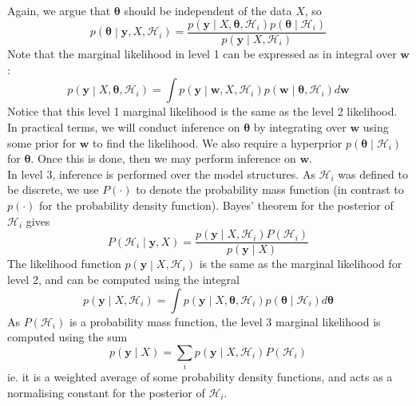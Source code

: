 \documentclass[11pt]{report} %
\begin{document}
Again, we argue that $\boldsymbol{\theta}$ should be independent of the data $X$, so
\begin{equation}
p\left(\boldsymbol{\theta}\middle|\mathbf{y}, X, \mathcal{H}_{i}\right) = \dfrac{p\left(\mathbf{y}\middle|X, \boldsymbol{\theta}, \mathcal{H}_{i}\right) p\left(\boldsymbol{\theta}\middle| \mathcal{H}_{i}\right)}{p\left(\mathbf{y}\middle|X, \mathcal{H}_{i}\right)}
\end{equation}
Note that the marginal likelihood in level 1 can be expressed as in integral over $\mathbf{w}$:
\begin{equation}
p\left(\mathbf{y}\middle|X, \boldsymbol{\theta}, \mathcal{H}_{i}\right) = \int p\left(\mathbf{y}\middle|\mathbf{w}, X, \mathcal{H}_{i}\right)p\left(\mathbf{w}\middle|\boldsymbol{\theta}, \mathcal{H}_{i}\right) d\mathbf{w}
\end{equation}
Notice that this level 1 marginal likelihood is the same as the level 2 likelihood. In practical terms, we will conduct inference on $\boldsymbol{\theta}$ by integrating over $\mathbf{w}$ using some prior for $\mathbf{w}$ to find the likelihood. We also require a hyperprior $p\left(\boldsymbol{\theta}\middle|\mathcal{H}_{i}\right)$ for $\boldsymbol{\theta}$. Once this is done, then we may perform inference on $\mathbf{w}$. \\

In level 3, inference is performed over the model structures. As $\mathcal{H}_{i}$ was defined to be discrete, we use $P\left(\cdot\right)$ to denote the probability mass function (in contrast to $p\left(\cdot\right)$ for the probability density function). Bayes' theorem for the posterior of $\mathcal{H}_{i}$ gives
\begin{equation}
P\left(\mathcal{H}_{i}\middle|\mathbf{y}, X\right) = \dfrac{p\left(\mathbf{y}\middle|X, \mathcal{H}_{i}\right)P\left(\mathcal{H}_{i}\right)}{p\left(\mathbf{y}\middle|X\right)}
\end{equation}
The likelihood function $p\left(\mathbf{y}\middle|X, \mathcal{H}_{i}\right)$ is the same as the marginal likelihood for level 2, and can be computed using the integral
\begin{equation}
p\left(\mathbf{y}\middle|X, \mathcal{H}_{i}\right) = \int p\left(\mathbf{y}\middle|X, \boldsymbol{\theta}, \mathcal{H}_{i}\right) p\left(\boldsymbol{\theta}\middle| \mathcal{H}_{i}\right) d\boldsymbol{\theta}
\end{equation}
As $P\left(\mathcal{H}_{i}\right)$ is a probability mass function, the level 3 marginal likelihood is computed using the sum
\begin{equation}
p\left(\mathbf{y}\middle|X\right) = \sum_{i}p\left(\mathbf{y}\middle|X, \mathcal{H}_{i}\right)P\left(\mathcal{H}_{i}\right)
\end{equation}
ie. it is a weighted average of some probability density functions, and acts as a normalising constant for the posterior of $\mathcal{H}_{i}$.
\end{document}
